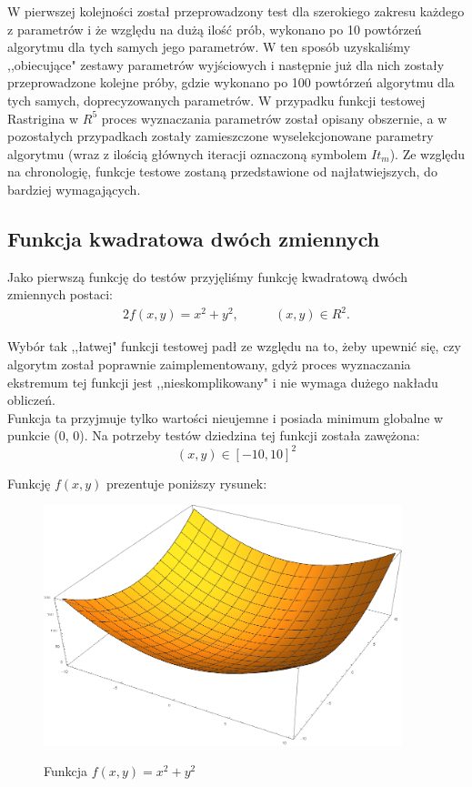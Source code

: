 \documentclass[twoside]{projektInzynierskiMS1}
\newcommand{\si}{ś}
\begin{document}
W pierwszej kolejno\si ci został przeprowadzony test dla szerokiego zakresu każdego z parametrów i że względu na dużą ilo\si ć prób, wykonano po 10 powtórzeń algorytmu dla tych samych jego parametrów. W ten sposób uzyskali\si my ,,obiecujące" zestawy parametrów wyj\si ciowych i następnie już dla nich zostały przeprowadzone kolejne próby, gdzie wykonano po 100 powtórzeń algorytmu dla tych samych, doprecyzowanych parametrów. W przypadku funkcji testowej Rastrigina w $R^5$ proces wyznaczania parametrów został opisany obszernie, a w pozostałych przypadkach zostały zamieszczone wyselekcjonowane parametry algorytmu (wraz z ilo\si cią głównych iteracji oznaczoną symbolem $It_m$). Ze względu na chronologię, funkcje testowe zostaną przedstawione od najłatwiejszych, do bardziej wymagających.



	\subsection{Funkcja kwadratowa dwóch zmiennych}
	Jako pierwszą funkcję do testów przyjęli\si my funkcję kwadratową dwóch zmiennych postaci:
\begin{alignat*}{2}
f(x, y) = x^2 + y^2,&\qquad  (x, y) \in R^2.
\end{alignat*}

Wybór tak ,,łatwej" funkcji testowej padł ze względu na to, żeby upewnić się, czy algorytm został poprawnie zaimplementowany, gdyż proces wyznaczania ekstremum tej funkcji jest ,,nieskomplikowany" i nie wymaga dużego nakładu obliczeń. \\

Funkcja ta przyjmuje tylko warto\si ci nieujemne i posiada minimum globalne w punkcie (0, 0). Na potrzeby testów dziedzina tej funkcji została zawężona:
\[(x, y)  \in [-10,10]^2 \]

Funkcję $f(x, y)$ prezentuje poniższy rysunek:\\
\begin{figure}[H]
	\begin{center}
		\includegraphics[height=7cm]{pics/quadraticFunction1.png}\\
	\end{center}
	\caption{Funkcja $f(x, y) = x^2 + y^2$}
\end{figure}
\end{document}
